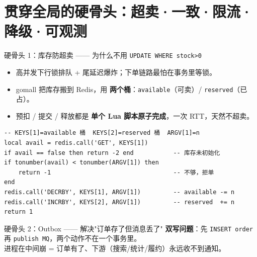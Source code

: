 \documentclass[aspectratio=169,11pt]{beamer}
\begin{document}
\section{贯穿全局的硬骨头：超卖·一致·限流·降级·可观测}

\begin{frame}{硬骨头 1：库存防超卖 —— 为什么不用 \texttt{UPDATE WHERE stock>0}}
\begin{itemize}
  \item 高并发下行锁排队 + 尾延迟爆炸；下单链路最怕在事务里等锁。
  \item gomall 把库存搬到 Redis，用 \textbf{两个桶}：\texttt{available}（可卖）/ \texttt{reserved}（已占）。
  \item 预扣 / 提交 / 释放都是 \textbf{单个 Lua 脚本原子完成}，一次 RTT，天然不超卖。
\end{itemize}
\begin{lstlisting}[language=LuaRedis,caption={reserveScript：available 与 reserved 两个 key 原子流转}]
-- KEYS[1]=available 桶  KEYS[2]=reserved 桶  ARGV[1]=n
local avail = redis.call('GET', KEYS[1])
if avail == false then return -2 end           -- 库存未初始化
if tonumber(avail) < tonumber(ARGV[1]) then
    return -1                                  -- 不够，拒单
end
redis.call('DECRBY', KEYS[1], ARGV[1])         -- available -= n
redis.call('INCRBY', KEYS[2], ARGV[1])         -- reserved  += n
return 1
\end{lstlisting}
\end{frame}

\begin{frame}[shrink]{硬骨头 2：Outbox —— 解决"订单存了但消息丢了"}
\textbf{双写问题}：先 \texttt{INSERT order} 再 \texttt{publish MQ}，两个动作不在一个事务里。\\
进程在中间崩 = 订单有了、下游（搜索/统计/履约）永远收不到通知。
\vspace{1mm}
\par\smallskip
{}
\end{frame}
\end{document}
